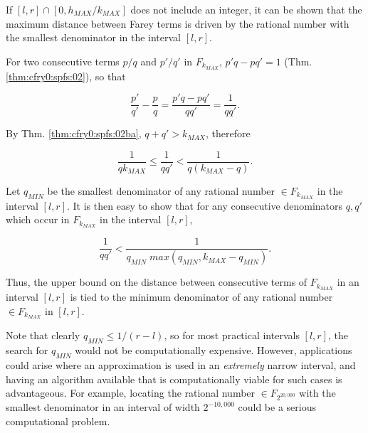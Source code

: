 If $[l, r] \cap  [0, h_{MAX}/k_{MAX}]$ does
not include an integer, it can be shown that the
maximum distance between Farey terms is driven by the
rational number with the smallest denominator in the
interval $[l, r]$.

For two consecutive terms $p/q$ and $p'/q'$ in $F_{k_{MAX}}$,
$p'q - pq' = 1$ (Thm. \ref{thm:cfry0:spfs:02}), so that

\begin{equation}
\frac{p'}{q'} - \frac{p}{q} =
\frac{p'q - pq'}{q q'} = \frac{1}{qq'} .
\end{equation}

By Thm. \ref{thm:cfry0:spfs:02ba}, $q+q' > k_{MAX}$, therefore

\begin{equation}
\label{eq:cfry0:schk0:minqplacementupperbound}
\frac{1}{q k_{MAX}} \leq
\frac{1}{q q'} <
\frac{1}{q (k_{MAX}-q)}.
\end{equation}

Let $q_{MIN}$ be the smallest denominator of any rational number
$\in F_{k_{MAX}}$ in the interval $[l,r]$.  It is then easy to show
that for any consecutive denominators $q, q'$ which occur in
$F_{k_{MAX}}$ in the interval $[l,r]$,

\begin{equation}
\frac{1}{q q'} < \frac{1}{q_{MIN} \; max (q_{MIN}, k_{MAX} - q_{MIN})} .
\end{equation}

Thus, the upper bound on the distance between consecutive terms of $F_{k_{MAX}}$
in an interval $[l,r]$ is tied to the minimum denominator of any
rational number $\in F_{k_{MAX}}$ in $[l,r]$.

Note that clearly
$q_{MIN} \leq 1/(r-l)$, so for most practical intervals $[l,r]$,
the search for $q_{MIN}$ would not be computationally expensive.
However, applications could arise where an approximation is used
in an \emph{extremely} narrow interval, and having an algorithm available that
is computationally viable for such cases is advantageous.  For example,
locating the rational number $\in F_{2^{20,000}}$ with the smallest denominator
in an interval of width $2^{-10,000}$ could be a serious computational
problem.

